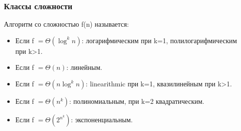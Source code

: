 \documentclass[russian, 12pt]{beamer}
\begin{document}
\lstset{style=mystyle}
\begin{frame}

\end{frame}
\begin{frame}
\frametitle{Классы сложности}
Алгоритм со сложностью f(n) называется:
\begin{itemize}
  \item Если f $=\Theta(\log^kn)$: 
  логарифмическим при k=1, полилогарифмическим при k>1.\\[0.3cm]

  \item Если f $=\Theta(n)$: 
  линейным.\\[0.3cm]

  \item Если f $=\Theta(n\log^kn)$: 
  linearithmic при k=1, квазилинейным при k>1.\\[0.3cm]
  
  \item Если f $=\Theta(n^k)$: 
  полиномиальным, при k=2 квадратическим. \\[0.3cm]
  
  \item Если f $=\Theta(2^{n^k})$: 
  экспоненциальным. \\

\end{itemize}
\end{frame}
\end{document}
